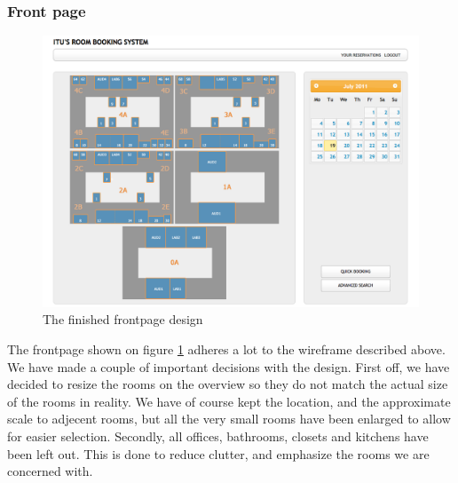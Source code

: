 \subsubsection*{Front page}
\begin{figure}[htb]
\begin{center}
\leavevmode
\includegraphics[width=1\textwidth]{images/screens/frontpage}
\end{center}
\caption{The finished frontpage design}
\label{fig:frontpage}
\end{figure}
The frontpage shown on figure \ref{fig:frontpage} adheres a lot to the wireframe described above. 
We have made a couple of important decisions with the design. First off, we have decided to resize the rooms on the overview so they do not match the actual size of the rooms in reality. We have of course kept the location, and the approximate scale to adjecent rooms, but all the very small rooms have been enlarged to allow for easier selection.
Secondly, all offices, bathrooms, closets and kitchens have been left out. This is done to reduce clutter, and emphasize the rooms we are concerned with.

\pagebreak
